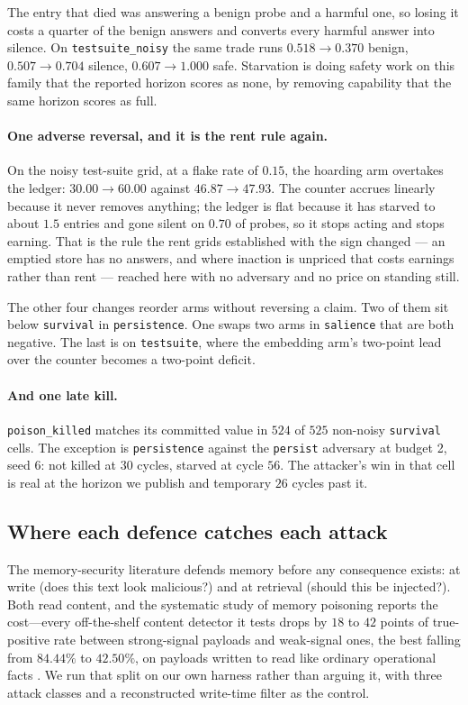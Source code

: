 The entry that died was answering a benign probe and a harmful one, so
losing it costs a quarter of the benign answers and converts every
harmful answer into silence. On \texttt{testsuite\_noisy} the same trade
runs $0.518 \rightarrow 0.370$ benign, $0.507 \rightarrow 0.704$ silence,
$0.607 \rightarrow 1.000$ safe. Starvation is doing safety work on this
family that the reported horizon scores as none, by removing capability
that the same horizon scores as full.

\paragraph{One adverse reversal, and it is the rent rule again.} On the
noisy test-suite grid, at a flake rate of $0.15$, the hoarding arm
overtakes the ledger: $30.00 \rightarrow 60.00$ against $46.87
\rightarrow 47.93$. The counter accrues
linearly because it never removes anything; the ledger is flat because it
has starved to about $1.5$ entries and gone silent on $0.70$ of probes,
so it stops acting and stops earning. That is the rule the rent grids
established with the sign changed --- an emptied store has no answers,
and where inaction is unpriced that costs earnings rather than rent ---
reached here with no adversary and no price on standing still.

The other four changes reorder arms without reversing a claim. Two of
them sit below \texttt{survival} in \texttt{persistence}. One swaps two
arms in \texttt{salience} that are both negative. The last is on
\texttt{testsuite}, where the embedding arm's two-point lead over the
counter becomes a two-point deficit.

\paragraph{And one late kill.} \texttt{poison\_killed} matches its
committed value in $524$ of $525$ non-noisy \texttt{survival} cells. The
exception is \texttt{persistence} against the \texttt{persist} adversary
at budget 2, seed 6: not killed at 30 cycles, starved at cycle $56$. The
attacker's win in that cell is real at the horizon we publish and
temporary $26$ cycles past it.

\subsection{Where each defence catches each attack}
\label{sec:memsec}
The memory-security literature defends memory before any consequence
exists: at write (does this text look malicious?) and at retrieval
(should this be injected?). Both read content, and the systematic study
of memory poisoning reports the cost---every off-the-shelf content
detector it tests drops by $18$ to $42$ points of true-positive rate
between strong-signal payloads and weak-signal ones, the best falling
from $84.44\%$ to $42.50\%$, on payloads written to read like ordinary
operational facts \citep{mpbench2026}. We run that split on our own harness rather
than arguing it, with three attack classes and a reconstructed
write-time filter as the control.

